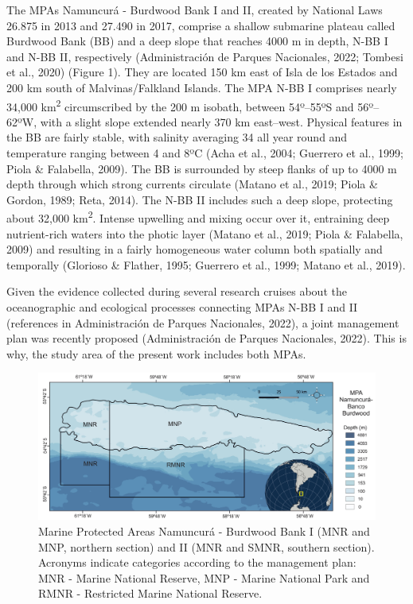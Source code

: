 \documentclass[preprint, 3p,
authoryear]{elsarticle} %
\begin{document}
The MPAs Namuncurá - Burdwood Bank I and II, created by National Laws
26.875 in 2013 and 27.490 in 2017, comprise a shallow submarine plateau
called Burdwood Bank (BB) and a deep slope that reaches 4000 m in depth,
N-BB I and N-BB II, respectively (Administración de Parques Nacionales,
2022; Tombesi et al., 2020) (Figure 1). They are located 150 km east of
Isla de los Estados and 200 km south of Malvinas/Falkland Islands. The
MPA N-BB I comprises nearly 34,000 km\textsuperscript{2} circumscribed
by the 200 m isobath, between 54º--55ºS and 56º--62ºW, with a slight
slope extended nearly 370 km east--west. Physical features in the BB are
fairly stable, with salinity averaging 34 all year round and temperature
ranging between 4 and 8ºC (Acha et al., 2004; Guerrero et al., 1999;
Piola \& Falabella, 2009). The BB is surrounded by steep flanks of up to
4000 m depth through which strong currents circulate (Matano et al.,
2019; Piola \& Gordon, 1989; Reta, 2014). The N-BB II includes such a
deep slope, protecting about 32,000 km\textsuperscript{2}. Intense
upwelling and mixing occur over it, entraining deep nutrient-rich waters
into the photic layer (Matano et al., 2019; Piola \& Falabella, 2009)
and resulting in a fairly homogeneous water column both spatially and
temporally (Glorioso \& Flather, 1995; Guerrero et al., 1999; Matano et
al., 2019).

Given the evidence collected during several research cruises about the
oceanographic and ecological processes connecting MPAs N-BB I and II
(references in Administración de Parques Nacionales, 2022), a joint
management plan was recently proposed (Administración de Parques
Nacionales, 2022). This is why, the study area of the present work
includes both MPAs.

\begin{figure}
\includegraphics[width=1\linewidth]{MPABurdwood_map} \caption{Marine Protected Areas Namuncurá - Burdwood Bank I (MNR and MNP, northern section) and II (MNR and SMNR, southern section). Acronyms indicate categories according to the management plan: MNR - Marine National Reserve, MNP - Marine National Park and RMNR - Restricted Marine National Reserve.}\label{fig:figure1}
\end{figure}
\end{document}
